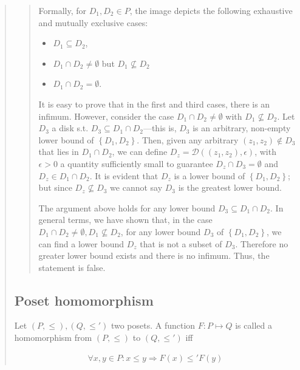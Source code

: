 \documentclass[a4paper, 12pt]{article}
\theoremstyle{definition}
\theoremstyle{definition}
\theoremstyle{definition}
\begin{document}
\begin{quote}
\begin{quote}
Formally, for $D_1, D_2 \in P$, the image depicts the following exhaustive and
mutually exclusive cases: 

\begin{itemize}
    \item $D_1 \subseteq  D_2$, 
    \item $ D_1 \cap D_2 \neq \emptyset$ but $D_1 \not\subseteq D_2$
    \item $D_1 \cap D_2 = \emptyset$. 
\end{itemize}

It is easy to prove that in the first and third cases, there is an infimum.
However, consider the case $D_1 \cap D_2 \neq \emptyset$ with $D_1 \not\subseteq
D_2$. Let $D_3$ a disk s.t. $D_3 \subseteq D_1 \cap D_2$---this is, $D_3$ is an
arbitrary, non-empty lower bound of $\left\{ D_1, D_2 \right\} $. Then, given
any arbitrary $(z_1, z_2) \not\in D_3$ that
lies in $D_1 \cap D_2$, we can define $D_z = \mathcal{D}((z_1, z_2), \epsilon)$, with
$\epsilon > 0$ a quantity sufficiently small to guarantee $D_z \cap D_3 =
\emptyset$ and $D_z \in D_1 \cap D_2$. It is evident that $D_z$ is a lower bound
of $\left\{ D_1, D_2 \right\} $; but since $D_z \not\subseteq D_3$ we cannot say
$D_3$ is the greatest lower bound.

The argument above holds for any lower bound $D_3 \subseteq D_1 \cap D_2$. In
general terms, we have shown that, in the case $D_1 \cap D_2 \neq \emptyset, D_1
\not\subseteq D_2$, for any lower bound $D_3$ of $\left\{ D_1, D_2 \right\} $,
we can find a lower bound $D_z$ that is not a subset of $D_3$. Therefore no
greater lower bound exists and there is no infimum. Thus, the statement is
false.

\end{quote}
\normalsize



\subsection{Poset homomorphism}

Let $(P, \leq), (Q, \leq')  $ two posets. A function $F : P \mapsto Q$ is called
a homomorphism from $(P, \leq) $ to $(Q, \leq')$ iff 

\begin{align*}
    \forall x, y \in P : x \leq y \Rightarrow F(x) \leq' F(y)
\end{align*}



\end{quote}
\end{document}
